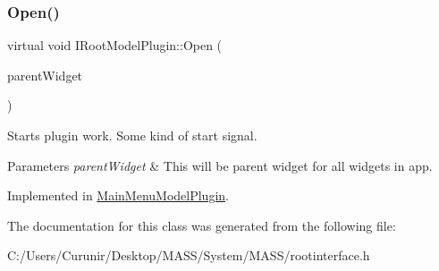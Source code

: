 \subsubsection{\texorpdfstring{Open()}{Open()}}
{\footnotesize\ttfamily virtual void I\+Root\+Model\+Plugin\+::\+Open (\begin{DoxyParamCaption}\item[{Q\+Widget $\ast$}]{parent\+Widget }\end{DoxyParamCaption})\hspace{0.3cm}{\ttfamily [pure virtual]}}



Starts plugin work. Some kind of \textquotesingle{}start\textquotesingle{} signal. 


\begin{DoxyParams}{Parameters}
{\em parent\+Widget} & This will be parent widget for all widgets in app. \\
\hline
\end{DoxyParams}


Implemented in \hyperlink{class_main_menu_model_plugin_a2eb04afbe1c9a301a7031816f37018ab}{Main\+Menu\+Model\+Plugin}.



The documentation for this class was generated from the following file\+:\begin{DoxyCompactItemize}
\item 
C\+:/\+Users/\+Curunir/\+Desktop/\+M\+A\+S\+S/\+System/\+M\+A\+S\+S/rootinterface.\+h\end{DoxyCompactItemize}
